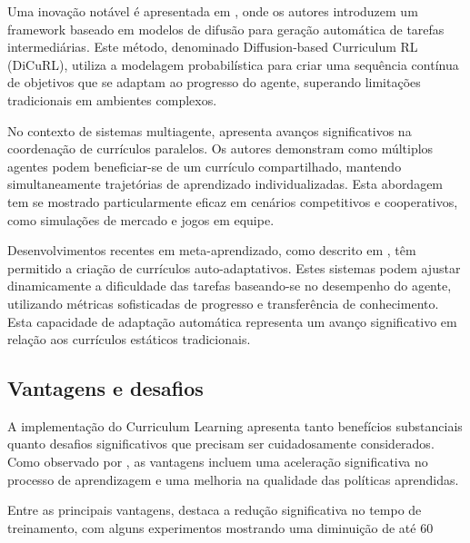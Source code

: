 Uma inovação notável é apresentada em \cite{https://openreview.net/forum?id=yRhrVaDOWE}, onde os autores introduzem um framework baseado em modelos de difusão para geração automática de tarefas intermediárias. Este método, denominado Diffusion-based Curriculum RL (DiCuRL), utiliza a modelagem probabilística para criar uma sequência contínua de objetivos que se adaptam ao progresso do agente, superando limitações tradicionais em ambientes complexos.

No contexto de sistemas multiagente, \cite{https://www.ijcai.org/proceedings/2017/757} apresenta avanços significativos na coordenação de currículos paralelos. Os autores demonstram como múltiplos agentes podem beneficiar-se de um currículo compartilhado, mantendo simultaneamente trajetórias de aprendizado individualizadas. Esta abordagem tem se mostrado particularmente eficaz em cenários competitivos e cooperativos, como simulações de mercado e jogos em equipe.

Desenvolvimentos recentes em meta-aprendizado, como descrito em \cite{https://arxiv.org/abs/2310.19424}, têm permitido a criação de currículos auto-adaptativos. Estes sistemas podem ajustar dinamicamente a dificuldade das tarefas baseando-se no desempenho do agente, utilizando métricas sofisticadas de progresso e transferência de conhecimento. Esta capacidade de adaptação automática representa um avanço significativo em relação aos currículos estáticos tradicionais.

\subsection{Vantagens e desafios}
\label{subsec:curriculum_vantagens_desafios}

A implementação do Curriculum Learning apresenta tanto benefícios substanciais quanto desafios significativos que precisam ser cuidadosamente considerados. Como observado por \cite{https://zilliz.com/ai-faq/what-is-curriculum-learning-in-reinforcement-learning}, as vantagens incluem uma aceleração significativa no processo de aprendizagem e uma melhoria na qualidade das políticas aprendidas.

Entre as principais vantagens, \cite{https://repositories.lib.utexas.edu/items/d6530e2e-35e5-452e-972c-8b3bb1dea93b} destaca a redução significativa no tempo de treinamento, com alguns experimentos mostrando uma diminuição de até 60%

